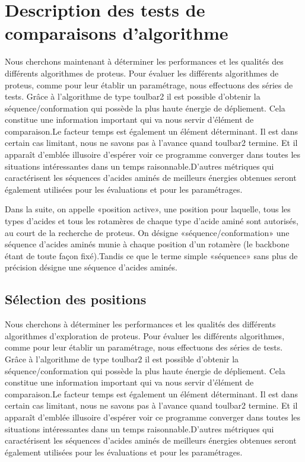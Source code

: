 \section{Description des tests de comparaisons d'algorithme} 
\label{sec:methodes_pratiques}
Nous cherchons maintenant à déterminer les performances et les qualités des différents algorithmes de proteus.
Pour évaluer les différents algorithmes de proteus, comme pour leur établir un paramétrage, nous effectuons des séries de tests. 
Grâce à l'algorithme de type toulbar2 il est possible d'obtenir la séquence/conformation qui possède la plus haute énergie de dépliement. Cela constitue une information important qui va nous servir d'élément de comparaison.Le facteur temps est également un élément déterminant. Il est dans certain cas limitant, nous ne savons pas à l'avance quand toulbar2 termine. Et il apparaît d'emblée illusoire d'espérer voir ce programme converger dans toutes les situations intéressantes dans un temps raisonnable.D'autres métriques qui caractérisent les séquences d'acides aminés de meilleurs énergies obtenues seront également utilisées pour les évaluations et pour les paramétrages.   

Dans la suite, on appelle «position active», une position pour laquelle, tous les types d'acides et tous les rotamères de chaque type d'acide aminé sont autorisés, au court de la recherche de proteus. On désigne «séquence/conformation» une séquence d'acides aminés munie à chaque position d'un rotamère (le backbone étant de toute façon fixé).Tandis ce que le terme simple «séquence»  sans plus de précision désigne une séquence d'acides aminés.


\subsection{Sélection des positions}

Nous cherchons à déterminer les performances et les qualités des différents algorithmes d'exploration de proteus.
Pour évaluer les différents algorithmes, comme pour leur établir un paramétrage, nous effectuons des séries de tests. 
Grâce à l'algorithme de type toulbar2 il est possible d'obtenir la séquence/conformation qui possède la plus haute énergie de dépliement. Cela constitue une information important qui va nous servir d'élément de comparaison.Le facteur temps est également un élément déterminant. Il est dans certain cas limitant, nous ne savons pas à l'avance quand toulbar2 termine. Et il apparaît d'emblée illusoire d'espérer voir ce programme converger dans toutes les situations intéressantes dans un temps raisonnable.D'autres métriques qui caractérisent les séquences d'acides aminés de meilleurs énergies obtenues seront également utilisées pour les évaluations et pour les paramétrages.   

